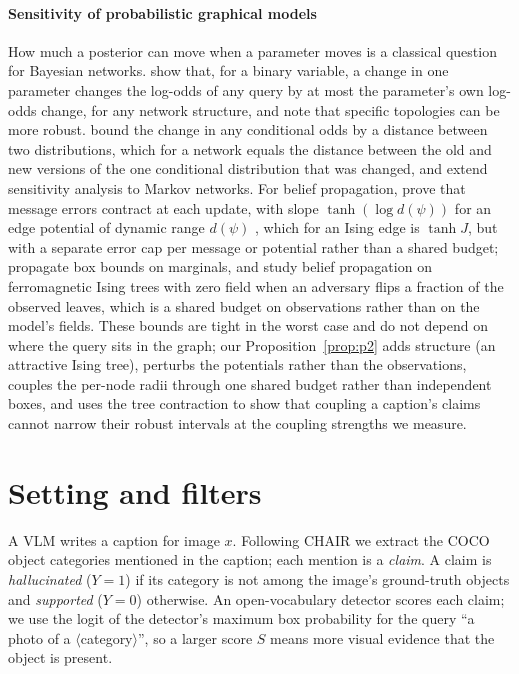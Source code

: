\paragraph{Sensitivity of probabilistic graphical models} How much a posterior can move when a parameter moves is a classical question for Bayesian networks. \citet{chan2002numbers} show that, for a binary variable, a change in one parameter changes the log-odds of any query by at most the parameter's own log-odds change, for any network structure, and note that specific topologies can be more robust. \citet{chan2005distance} bound the change in any conditional odds by a distance between two distributions, which for a network equals the distance between the old and new versions of the one conditional distribution that was changed, and \citet{chan2005markov} extend sensitivity analysis to Markov networks. For belief propagation, \citet{ihler2005loopy} prove that message errors contract at each update, with slope $\tanh(\log d(\psi))$ for an edge potential of dynamic range $d(\psi)$ \citep[Theorem~8]{ihler2005loopy}, which for an Ising edge is $\tanh J$, but with a separate error cap per message or potential rather than a shared budget; \citet{mooij2008bounds} propagate box bounds on marginals, and \citet{hopkins2024adversarially} study belief propagation on ferromagnetic Ising trees with zero field when an adversary flips a fraction of the observed leaves, which is a shared budget on observations rather than on the model's fields. These bounds are tight in the worst case and do not depend on where the query sits in the graph; our Proposition~\ref{prop:p2} adds structure (an attractive Ising tree), perturbs the potentials rather than the observations, couples the per-node radii through one shared budget rather than independent boxes, and uses the tree contraction to show that coupling a caption's claims cannot narrow their robust intervals at the coupling strengths we measure.

\section{Setting and filters}\label{sec:setting}

A VLM writes a caption for image $x$. Following CHAIR \citep{rohrbach2018chair} we extract the COCO object categories mentioned in the caption; each mention is a \emph{claim}. A claim is \emph{hallucinated} ($Y=1$) if its category is not among the image's ground-truth objects and \emph{supported} ($Y=0$) otherwise. An open-vocabulary detector scores each claim; we use the logit of the detector's maximum box probability for the query ``a photo of a $\langle$category$\rangle$'', so a larger score $S$ means more visual evidence that the object is present.

